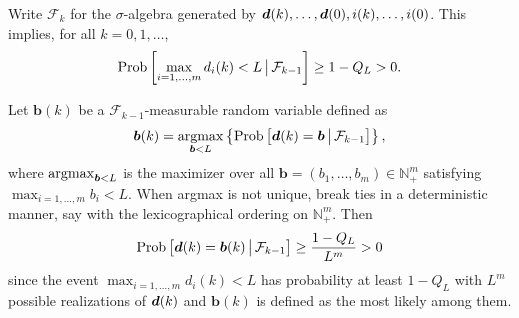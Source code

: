 \documentclass[10pt,mathserif]{beamer}
\begin{document}
\begin{frame}[plain]
Write $\mathcal{F}_k$ for the $\sigma$\nobreakdash-algebra generated by $\boldsymbol{d}(k),\dots,\boldsymbol{d}(0),i(k),\dots,i(0)$.
This implies, for all $k=0,1,\dots$,
\[
{\mathrm{Prob}}\left[\max_{i=1,\dots,m}d_i(k)<L\,\big|\,\mathcal{F}_{k-1}\right]\ge 1-Q_L>0.
\]


\vspace{0.1in}

Let $\boldsymbol{b}(k)$ be a $\mathcal{F}_{k-1}$-measurable random variable defined as
\[
\boldsymbol{b}(k)=\operatorname*{argmax}_{\boldsymbol{b}<L}\left\{{\mathrm{Prob}}\left[\boldsymbol{d}(k)=\boldsymbol{b}\,\big|\,\mathcal{F}_{k-1}\right]\right\},
\]
where $\operatorname*{argmax}_{\boldsymbol{b}<L}$ is the maximizer over all $\boldsymbol{b}=(b_1,\dots,b_m)\in\mathbb{N}_+^m$ satisfying $\max_{i=1,\dots,m}b_i<L$.
When argmax is not unique, break ties in a deterministic manner, say with the lexicographical ordering on $\mathbb{N}_+^m$.
Then
\[
{\mathrm{Prob}}\left[\boldsymbol{d}(k)=\boldsymbol{b}(k)\,\big|\,\mathcal{F}_{k-1}\right]\ge \frac{1-Q_L}{L^m}>0
\]
since the event $\max_{i=1,\dots,m}d_i(k)<L$ has probability at least $1-Q_L$ with $L^m$ possible realizations of $\boldsymbol{d}(k)$ and $\boldsymbol{b}(k)$ is defined as the most likely among them.
\end{frame}
\end{document}
